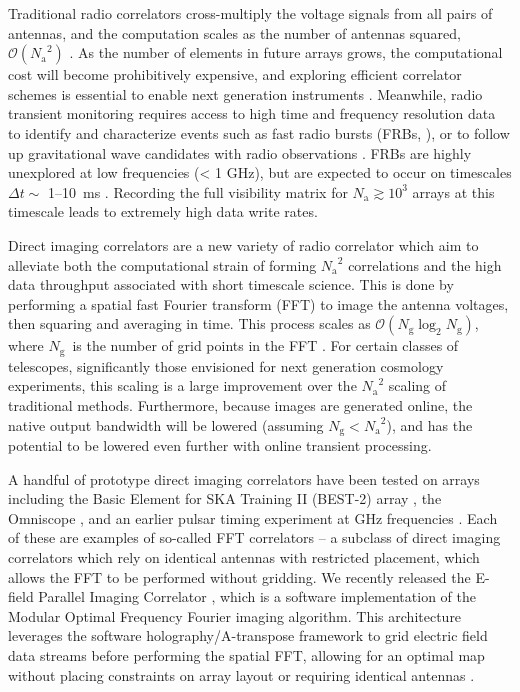 \documentclass[a4paper,fleqn,usenatbib]{mnras}
\newcommand{\Nant}{\ensuremath{N_{\mathrm{a}}}}
\newcommand{\Ng}{\ensuremath{N_{\mathrm{g}}}}
\begin{document}
Traditional radio correlators cross-multiply the voltage signals from all pairs of antennas, and the computation scales as the number of antennas squared, $\mathcal{O}(\Nant^2)$ \citep{bun04}. As the number of elements in future arrays grows, the computational cost will become prohibitively expensive, and exploring efficient correlator schemes is essential to enable next generation instruments \citep{lon00}. Meanwhile, radio transient monitoring requires access to high time and frequency resolution data to identify and characterize events such as fast radio bursts (FRBs, \citealt{lor07}), or to follow up gravitational wave candidates with radio observations \citep{abb16a,abb16b}. FRBs are highly unexplored at low frequencies (< 1 GHz), but are expected to occur on timescales $\Delta t \sim$ 1--10~ms \citep{tho13}. Recording the full visibility matrix for $\Nant \gtrsim 10^3$ arrays at this timescale leads to extremely high data write rates. 

Direct imaging correlators are a new variety of radio correlator which aim to alleviate both the computational strain of forming $\Nant^2$ correlations and the high data throughput associated with short timescale science. This is done by performing a spatial fast Fourier transform (FFT) to image the antenna voltages, then squaring and averaging in time. This process scales as $\mathcal{O}(\Ng \log_2 \Ng)$, where \Ng~is the number of grid points in the FFT \citep{mor11, teg09, teg10}. For certain classes of telescopes, significantly those envisioned for next generation cosmology experiments, this scaling is a large improvement over the $\Nant^2$ scaling of traditional methods. Furthermore, because images are generated online, the native output bandwidth will be lowered (assuming $\Ng < \Nant^2$), and has the potential to be lowered even further with online transient processing.

A handful of prototype direct imaging correlators have been tested on arrays including the Basic Element for SKA Training II (BEST-2) array \citep{fos14}, the Omniscope \citep{zhe14}, and an earlier pulsar timing experiment at GHz frequencies \citep{oto94, dai00}. Each of these are examples of so-called FFT correlators -- a subclass of direct imaging correlators which rely on identical antennas with restricted placement, which allows the FFT to be performed without gridding. We recently released the E-field Parallel Imaging Correlator \citep[EPIC;][]{thy15c}, which is a software implementation of the Modular Optimal Frequency Fourier \citep[MOFF;][]{mor11} imaging algorithm. This architecture leverages the software holography/A-transpose framework to grid electric field data streams before performing the spatial FFT, allowing for an optimal map without placing constraints on array layout or requiring identical antennas \citep{mor09,bha08,teg97a}.
\end{document}
